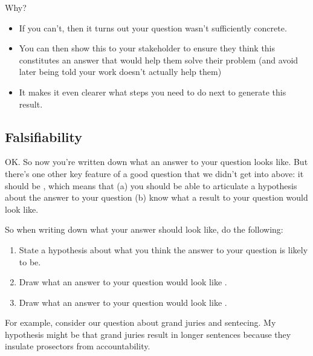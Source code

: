 \documentclass[letterpaper,10pt,english]{jupyterBook}
\begin{document}
\sphinxAtStartPar
Why?
\begin{itemize}
\item {} 
\sphinxAtStartPar
If you can’t, then it turns out your question wasn’t sufficiently concrete.

\item {} 
\sphinxAtStartPar
You can then show this to your stakeholder to ensure they think this constitutes an answer that would help them solve their problem (and avoid later being told your work doesn’t actually help them)

\item {} 
\sphinxAtStartPar
It makes it even clearer what steps you need to do next to generate this result.

\end{itemize}


\subsection{Falsifiability}
\label{\detokenize{40_in_practice/00_backwards_design:falsifiability}}
\sphinxAtStartPar
OK. So now you’re written down what an answer to your question looks like. But there’s one other key feature of a good question that we didn’t get into above: it should be , which means that (a) you should be able to articulate a hypothesis about the answer to your question  (b) know what a result to your question would look like.

\sphinxAtStartPar
So when writing down what your answer should look like, do the following:
\begin{enumerate}
%
\item {} 
\sphinxAtStartPar
State a hypothesis about what you think the answer to your question is likely to be.

\item {} 
\sphinxAtStartPar
Draw what an answer to your question would look like .

\item {} 
\sphinxAtStartPar
Draw what an answer to your question would look like .

\end{enumerate}

\sphinxAtStartPar
For example, consider our question about grand juries and sentecing. My hypothesis might be that grand juries result in longer sentences because they insulate prosectors from accountability.
\end{document}
